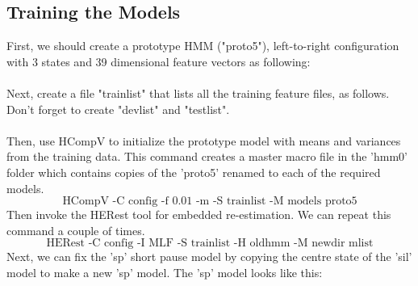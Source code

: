 \documentclass{article}
\begin{document}
\subsection{Training the Models}
First, we should create a prototype HMM ("proto5"), left-to-right configuration with 3 states and 39 dimensional feature vectors as following:
\\[2mm]
\\[2mm]
Next, create a file "trainlist" that lists all the training feature files, as follows. Don't forget to create "devlist" and "testlist". 
\\[2mm]
\\[2mm]
Then, use HCompV to initialize the prototype model with means and variances from the training data. This command creates a master macro file in the 'hmm0' folder which contains copies of the 'proto5' renamed to each of the required models. 
$$\text{HCompV -C config -f 0.01 -m -S trainlist -M models proto5}$$
Then invoke the HERest tool for embedded re-estimation. We can repeat this command a couple of times. 
$$\text{HERest -C config -I MLF -S trainlist -H oldhmm -M newdir mlist}$$
Next, we can fix the 'sp' short pause model by copying the centre state of the 'sil' model to make a new 'sp' model. The 'sp' model looks like this:\\[2mm]
\\[2mm]
\end{document}
